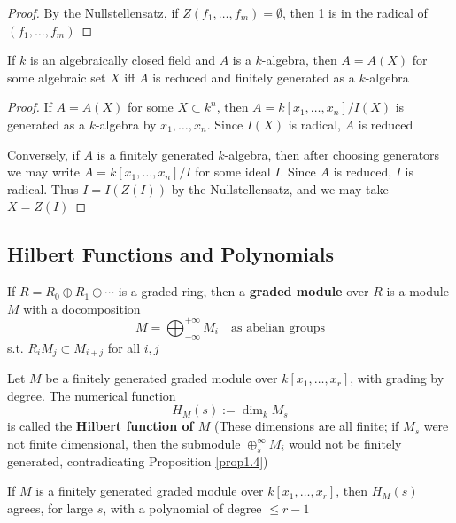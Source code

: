\documentclass[11pt]{article}
\begin{document}
\begin{proof}
By the Nullstellensatz, if \(Z(f_1,\dots,f_m)=\emptyset\), then 1 is in the
radical of \((f_1,\dots,f_m)\)
\end{proof}

\begin{corollary}[]
If \(k\) is an algebraically closed field and \(A\) is a \(k\)-algebra, then
\(A=A(X)\) for some algebraic set \(X\) iff \(A\) is reduced and finitely
generated as a \(k\)-algebra
\end{corollary}

\begin{proof}
If \(A=A(X)\) for some \(X\subset k^n\), then \(A=k[x_1,\dots,x_n]/I(X)\) is
generated as a \(k\)-algebra by \(x_1,\dots,x_n\). Since \(I(X)\) is radical,
\(A\) is reduced

Conversely, if \(A\) is a finitely generated \(k\)-algebra, then after
choosing generators we may write \(A=k[x_1,\dots,x_n]/I\) for some ideal
\(I\). Since \(A\) is reduced, \(I\) is radical. Thus \(I=I(Z(I))\) by the
Nullstellensatz, and we may take \(X=Z(I)\)
\end{proof}
\subsection{Hilbert Functions and Polynomials}
\label{sec:org64b3499}
\begin{definition}[]
If \(R=R_0\oplus R_1\oplus\cdots\) is a graded ring, then a \textbf{graded module}
over \(R\) is a module \(M\) with a docomposition
\begin{equation*}
M=\bigoplus_{-\infty}^{+\infty}M_i\quad\text{as abelian groups}
\end{equation*}
s.t. \(R_iM_j\subset M_{i+j}\) for all \(i,j\)
\end{definition}

\begin{definition}[]
Let \(M\) be a finitely generated graded module over \(k[x_1,\dots,x_r]\),
with grading by degree. The numerical function
\begin{equation*}
H_M(s):=\dim_kM_s
\end{equation*}
is called the \textbf{Hilbert function of \(M\)} (These dimensions are all finite; if
\(M_s\) were not finite dimensional, then the submodule
\(\oplus_s^{\infty}M_i\) would not be finitely generated, contradicating
Proposition \ref{prop1.4})
\end{definition}

\begin{theorem}[Hilbert]
\label{thm1.11}
If \(M\) is a finitely generated graded module over \(k[x_1,\dots,x_r]\),
then \(H_M(s)\) agrees, for large \(s\), with a polynomial of degree \(\le r-1\)
\end{theorem}
\end{document}
